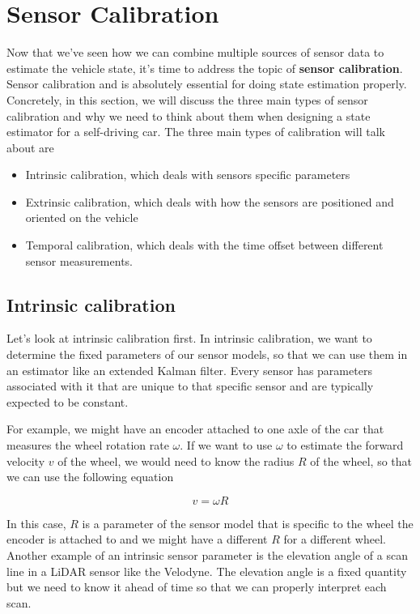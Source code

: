 \section{Sensor Calibration}
\label{sensor_calibration}

Now that we've seen how we can combine multiple sources
of sensor data to estimate the vehicle state, it's time to address the topic of \textbf{sensor calibration}.
Sensor calibration and is absolutely essential for doing state estimation properly. Concretely, in this section,
we will discuss the three main types of sensor calibration and why we need to think about
them when  designing a state estimator for a self-driving car. The three main types
of calibration will talk about are

\begin{itemize}
\item Intrinsic calibration, which deals with sensors specific parameters
\item Extrinsic calibration, which deals with how the sensors are positioned and oriented
on the vehicle
\item Temporal calibration, which deals with the time offset between different sensor
measurements. 
\end{itemize}

\subsection{Intrinsic calibration}
\label{intrinsic_calibration}
Let's look at intrinsic calibration first. In intrinsic calibration, we want to determine the fixed parameters
of our sensor models, so that we can use them in an estimator like an extended Kalman filter. Every sensor
has parameters associated with it that are unique to that
specific sensor and are typically expected to be constant. 

For example, we might have an encoder attached to one axle of the car that measures the wheel rotation
rate $\omega$. If we want to use $\omega$ to estimate the forward velocity
$v$ of the wheel, we would need to know the radius $R$ of the wheel, so that we can use
the following equation 

\begin{equation}
v = \omega R
\end{equation}

In this case, $R$ is a parameter of the sensor model that is specific to the wheel the encoder is attached to
and we might have a different $R$ for
a different wheel. Another example of an intrinsic sensor
parameter is the elevation angle of a scan line in a LiDAR sensor
like the Velodyne. The elevation angle is a fixed quantity but we
need to know it ahead of time so that we can properly interpret
each scan. 

